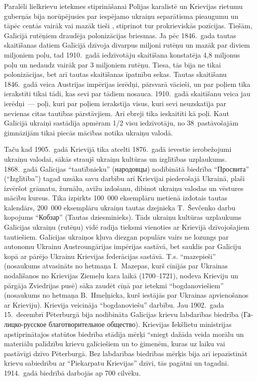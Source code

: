\documentclass[twoside,a5paper,12pt,fleqn,openany]{extbook}
\newcommand{\rutxti}[1]{\textrussian{#1}}
\newcommand{\uktxti}[1]{\textukrainian{#1}}
\begin{document}
Paralēli lielkrievu ietekmes stiprināšanai Polijas karalistē un Krievijas rietumu guberņās  bija norūpējusies par iespējamo ukraiņu separātisma pieaugumu un tāpēc centās vairāk vai mazāk tieši , stiprinot tur prokrieviskās pozīcijas. Tiešām, Galīcijā rutēņiem draudēja polonizācijas briesmas. Ja pēc 1846.~gada tautas skaitīšanas datiem Galīcijā dzīvoja divarpus miljoni rutēņu un mazāk par diviem miljoniem poļu, tad 1910.~gadā iedzīvotāju skaitīšana konstatēja 4,8 miljonus poļu un nedaudz vairāk par 3 miljoniem rutēņu. Tiesa, tās bija ne tikai polonizācijas, bet arī tautas skaitīšanas īpatnību sekas. Tautas skaitīšanu 1846.~gadā veica Austrijas impērijas ierēdņi, pārsvarā vācieši, un par poļiem tika ierakstīti tikai tādi, kas sevi par tādiem nosauca. 1910.~gadā skaitīšanu veica jau ierēdņi~--- poļi, kuri par poļiem ierakstīja visus, kuri sevi neuzskatīja par nevienas citas tautības pārstāvjiem. Arī ebreji tika ieskaitīti kā poļi. Kaut Galīcijā ukraiņi sastādīja apmēram 1/2 visu iedzīvotāju, no 38~pastāvošajām ģimnāzijām tikai piecās mācības notika ukraiņu valodā.

Taču kad 1905.~gadā Krievijā tika atcelti 1876.~gadā ievestie ierobežojumi ukraiņu valodai, sākās straujš ukraiņu kultūras un izglītības uzplaukums. 1868.~gadā Galīcijas ``tautībnieku'' (\rutxti{народовцы}) nodibinātā biedrība ``\uktxti{Просвита}'' (``Izglītība'') tagad uzsāka savu darbību arī Krievijai piederošajā Ukrainā, plaši izvēršot grāmatu, žurnālu, avīžu izdošanu, dibinot ukraiņu valodas un vēstures mācību kursus. Tika izpirkts 100~000 eksemplāru metienā izdotais tautas kalendārs, 200~000 eksemplāru ukraiņu tautas dzejnieka T.~Ševčenko darbu kopojums ``\uktxti{Кобзар}'' (Tautas dziesminieks). Tāds ukraiņu kultūras uzplaukums Galīcijas ukraiņu (rutēņu) vidē radīja tieksmi vienoties ar Krievijā dzīvojošajiem tautiešiem. Galīcijas ukraiņos kļuva diezgan populārs vairs ne lozungs par autonomu Ukrainu Austroungārijas impērijas sastāvā, bet sauklis par Galīciju kopā ar pārējo Ukrainu Krievijas federācijas sastāvā. T.s. ``mazepieši'' (nosaukums atvasināts no hetmaņa I.~Mazepas, kurš cīnījās par Ukrainas nodalīšanos no Krievijas Ziemeļu kara laikā (1700--1721), nodeva Krieviju un pārgāja Zviedrijas pusē) sāka zaudēt cīņā par ietekmi ``bogdanoviešiem'' (nosaukums no hetmaņa B.~Hmeļņicka, kurš iestājās par Ukrainas apvienošanos ar Krieviju). Krievija veicināja ``bogdanoviešu'' darbību. Jau 1902.~gada 15.~decembrī Pēterburgā bija nodibināta Galīcijas krievu labdarības biedrība (\rutxti{Галицко-русское благотворительное общество}). Krievijas Iekšlietu ministrijas apstiprinātajos statūtos biedrība stādīja mērķi ``sniegt dažāda veida morālu un materiālu palīdzību krievu galīciešiem un to ģimenēm, kuras uz laiku vai pastāvīgi dzīvo Pēterburgā. Bez labdarības biedrības mērķis bija arī iepazīstināt krievu sabiedrību ar ``Piekarpatu Krievijas'' dzīvi, tās pagātni un tagadni. 1914.~gadā biedrībā darbojās ap 700 cilvēku.
\end{document}
